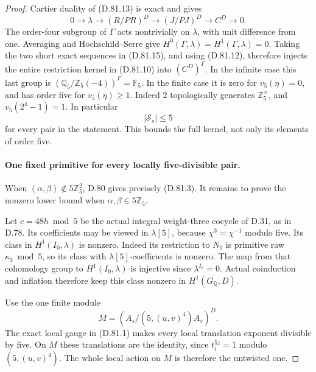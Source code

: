 \begin{proof}
Cartier duality of (D.81.13) is exact and gives
\[
 0\longrightarrow\lambda\longrightarrow (R/PR)^D
       \longrightarrow (J/PJ)^D\longrightarrow C^D
       \longrightarrow0.                                \tag{D.81.15}
\]
The order-four subgroup of \(\Gamma\) acts nontrivially
on \(\lambda\), with unit difference from one. Averaging
and Hochschild--Serre give
\(H^0(\Gamma,\lambda)=H^1(\Gamma,\lambda)=0\).
Taking the two short exact sequences in (D.81.15), and
using (D.81.12), therefore injects the entire restriction
kernel in (D.81.10) into \((C^D)^\Gamma\).
In the infinite case this last group is
\((\mathbb Q_5/\mathbb Z_5(-4))^\Gamma=\mathbb F_5\).
In the finite case it is zero for \(v_5(\eta)=0\), and
has order five for \(v_5(\eta)\ge1\).
Indeed \(2\) topologically generates \(\mathbb Z_5^\times\),
and \(v_5(2^4-1)=1\). In particular
\[
                         |\mathcal S_s|\le5            \tag{D.81.16}
\]
for every pair in the statement. This bounds the full kernel,
not only its elements of order five.

\paragraph{One fixed primitive for every locally five-divisible pair.}
When \((\alpha,\beta)\notin5\mathbb Z_5^2\), D.80 gives
precisely (D.81.3). It remains to prove the nonzero lower bound
when \(\alpha,\beta\in5\mathbb Z_5\).

Let \(c=48h\bmod5\) be the actual integral weight-three cocycle
of D.31, as in D.78. Its coefficients may be viewed in
\(\lambda[5]\), because \(\chi^3=\chi^{-1}\) modulo five.
Its class in \(H^1(I_0,\lambda)\) is nonzero.
Indeed its restriction to \(N_0\) is primitive raw
\(\kappa_3\bmod5\), so its class with \(\lambda[5]\)-coefficients
is nonzero. The map from that cohomology group to
\(H^1(I_0,\lambda)\) is injective since \(\lambda^{I_0}=0\).
Actual coinduction and inflation therefore keep this class
nonzero in \(H^1(G_{\mathbb Q},D)\).

Use the one finite module
\[
 M=(A_s/(5,(u,v)^4)A_s)^D.
                                                               \tag{D.81.17}
\]
The exact local gauge in (D.81.1) makes every local translation
exponent divisible by five. On \(M\) these translations are
the identity, since \(t_i^{5z}=1\) modulo \((5,(u,v)^4)\).
The whole local action on \(M\) is therefore the untwisted one.


\end{proof}
